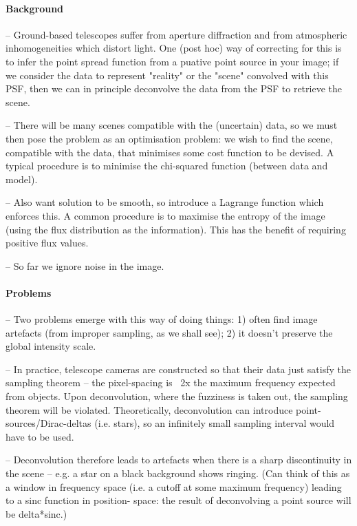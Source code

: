 \documentclass[letterpaper, 11pt]{article}
\begin{document}
\paragraph{Background}

-- Ground-based telescopes suffer from aperture diffraction and from atmospheric inhomogeneities which distort light. One (post hoc) way of 
correcting for this is to infer the point spread function from a puative point source in your image; if we consider the data to represent 
"reality" or the "scene" convolved with this PSF, then we can in principle deconvolve the data from the PSF to retrieve the scene. 

-- There will be many scenes compatible with the (uncertain) data, so we must then pose the problem as an optimisation problem: we wish to 
find the scene, compatible with the data, that minimises some cost function to be devised. A typical procedure is to minimise the chi-squared 
function (between data and model).

-- Also want solution to be smooth, so introduce a Lagrange function which enforces this. A common procedure is to maximise the entropy of the 
image (using the flux distribution as the information). This has the benefit of requiring positive flux values.

-- So far we ignore noise in the image.

\paragraph{Problems}

-- Two problems emerge with this way of doing things: 1) often find image artefacts (from improper sampling, as we shall see); 2) it doesn't 
preserve the global intensity scale.

-- In practice, telescope cameras are constructed so that their data just satisfy the sampling theorem -- the pixel-spacing is ~2x the maximum 
frequency expected from objects. Upon deconvolution, where the fuzziness is taken out, the sampling theorem will be violated. Theoretically, 
deconvolution can introduce point-sources/Dirac-deltas (i.e. stars), so an infinitely small sampling interval would have to be used.

-- Deconvolution therefore leads to artefacts when there is a sharp discontinuity in the scene -- e.g. a star on a black background shows 
ringing. (Can think of this as a window in frequency space (i.e. a cutoff at some maximum frequency) leading to a sinc function in position-
space: the result of deconvolving a point source will be delta*sinc.)
\end{document}
